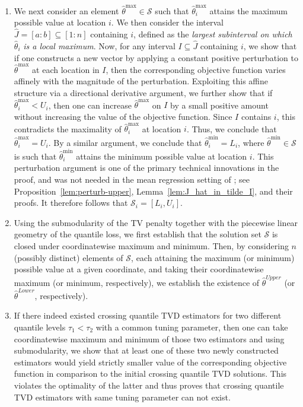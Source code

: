 \documentclass[11pt]{article}
\newcommand{\cS}{\mathcal{S}}
\theoremstyle{plain}
\theoremstyle{definition}
\theoremstyle{remark}
\begin{document}
\begin{enumerate}
\item We next consider an element $\hat{\theta}^{\max}\in \cS$ such that $\hat{\theta}^{\max}_i$ attains the maximum possible value at location $i$. We then consider the interval $\hat{J}=[a:b]\subseteq [1:n]$ containing $i$, defined as the \textit{largest subinterval on which} $\hat{\theta}_i$ \textit{is a local maximum}. Now, for any interval $I\subseteq \hat{J}$ containing $i$, we show that if one constructs a new vector by applying a constant positive perturbation to $\hat{\theta}^{\max}$ at each location in $I$, then the corresponding objective function varies affinely with the magnitude of the perturbation. Exploiting this affine structure via a directional derivative argument, we further show that if $\hat{\theta}^{\max}_i<U_i$, then one can increase $\hat{\theta}^{\max}$ on $I$ by a small positive amount without increasing the value of the objective function. Since $I$ contains $i$, this contradicts the maximality of $\hat{\theta}^{\max}_i$ at location $i$. Thus, we conclude that $\hat{\theta}^{\max}_i=U_i$. By a similar argument, we conclude that $\hat{\theta}^{\min}_i=L_i$, where $\hat{\theta}^{\min}\in \cS$ is such that $\hat{\theta}^{\min}_i$ attains the minimum possible value at location $i$. This perturbation argument is one of the primary technical innovations in the proof, and was not needed in the mean regression setting of \cite{chatterjee2026minmaxtrendfilteringgeneralizations}; see Proposition~\ref{lem:perturb-upper}, Lemma~\ref{lem:J_hat_in_tilde_I}, and their proofs. It therefore follows that $\cS_i=[L_i,U_i]$.
     \item Using the submodularity of the TV penalty together with the piecewise linear geometry of the quantile loss, we first establish that the solution set $\cS$ is closed under coordinatewise maximum and minimum. Then, by considering $n$ (possibly distinct) elements of $\cS$, each attaining the maximum (or minimum) possible value at a given coordinate, and taking their coordinatewise maximum (or minimum, respectively), we establish the existence of $\hat{\theta}^{Upper}$ (or $\hat{\theta}^{Lower}$, respectively).
     
     
     \item If there indeed existed crossing quantile TVD estimators for two different quantile levels $\tau_1<\tau_2$ with a common tuning parameter, then one can take coordinatewise maximum and minimum of those two estimators and using submodularity, we show that at least one of these two newly constructed estimators would yield strictly smaller value of the corresponding objective function in comparison to the initial crossing quantile TVD solutions. This violates the optimality of the latter and thus proves that crossing quantile TVD estimators with same tuning parameter can not exist.    
\end{enumerate}
\end{document}
